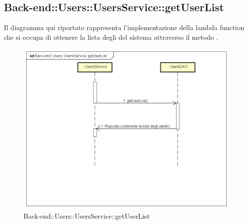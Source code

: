 \subsection{Back-end::Users::UsersService::getUserList}
Il diagramma qui riportato rappresenta l'implementazione della lambda function che si occupa di ottenere la lista degli  del sistema attraverso il metodo .
\begin{figure}[h] \centering \includegraphics[width=\textwidth,height=\textheight,keepaspectratio]{images/diagrams/back-end/Ufficial_Backend/Back-endUsersUsersServicegetUserList.png} 	\caption{Back-end::Users::UsersService::getUserList}
\end{figure}
\newpage


